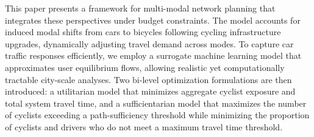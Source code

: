 \documentclass[lettersize,journal]{IEEEtran}
\begin{document}


This paper presents a framework for multi-modal network planning that integrates these perspectives under budget constraints. The model accounts for induced modal shifts from cars to bicycles following cycling infrastructure upgrades, dynamically adjusting travel demand across modes. To capture car traffic responses efficiently, we employ a surrogate machine learning model that approximates user equilibrium flows, allowing realistic yet computationally tractable city-scale analyses. Two bi-level optimization formulations are then introduced: a utilitarian model that minimizes aggregate cyclist exposure and total system travel time, and a sufficientarian model that maximizes the number of cyclists exceeding a path-sufficiency threshold while minimizing the proportion of cyclists and drivers who do not meet a maximum travel time threshold.


\end{document}
